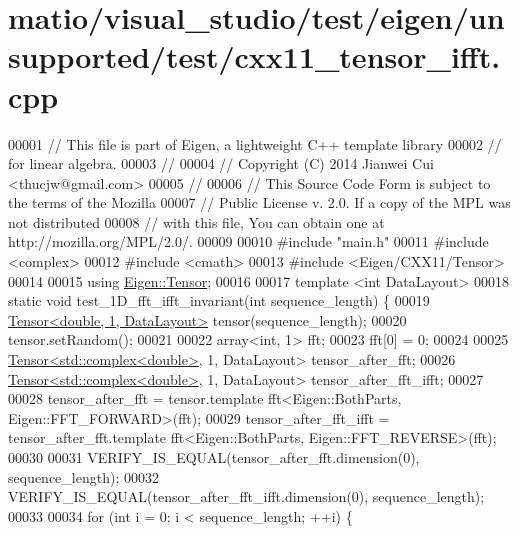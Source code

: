 \hypertarget{matio_2visual__studio_2test_2eigen_2unsupported_2test_2cxx11__tensor__ifft_8cpp_source}{}\section{matio/visual\+\_\+studio/test/eigen/unsupported/test/cxx11\+\_\+tensor\+\_\+ifft.cpp}
\label{matio_2visual__studio_2test_2eigen_2unsupported_2test_2cxx11__tensor__ifft_8cpp_source}

\begin{DoxyCode}
00001 \textcolor{comment}{// This file is part of Eigen, a lightweight C++ template library}
00002 \textcolor{comment}{// for linear algebra.}
00003 \textcolor{comment}{//}
00004 \textcolor{comment}{// Copyright (C) 2014 Jianwei Cui <thucjw@gmail.com>}
00005 \textcolor{comment}{//}
00006 \textcolor{comment}{// This Source Code Form is subject to the terms of the Mozilla}
00007 \textcolor{comment}{// Public License v. 2.0. If a copy of the MPL was not distributed}
00008 \textcolor{comment}{// with this file, You can obtain one at http://mozilla.org/MPL/2.0/.}
00009 
00010 \textcolor{preprocessor}{#include "main.h"}
00011 \textcolor{preprocessor}{#include <complex>}
00012 \textcolor{preprocessor}{#include <cmath>}
00013 \textcolor{preprocessor}{#include <Eigen/CXX11/Tensor>}
00014 
00015 \textcolor{keyword}{using} \hyperlink{class_eigen_1_1_tensor}{Eigen::Tensor};
00016 
00017 \textcolor{keyword}{template} <\textcolor{keywordtype}{int} DataLayout>
00018 \textcolor{keyword}{static} \textcolor{keywordtype}{void} test\_1D\_fft\_ifft\_invariant(\textcolor{keywordtype}{int} sequence\_length) \{
00019   \hyperlink{class_eigen_1_1_tensor}{Tensor<double, 1, DataLayout>} tensor(sequence\_length);
00020   tensor.setRandom();
00021 
00022   array<int, 1> fft;
00023   fft[0] = 0;
00024 
00025   \hyperlink{class_eigen_1_1_tensor}{Tensor<std::complex<double>}, 1, DataLayout> tensor\_after\_fft;
00026   \hyperlink{class_eigen_1_1_tensor}{Tensor<std::complex<double>}, 1, DataLayout> tensor\_after\_fft\_ifft;
00027 
00028   tensor\_after\_fft = tensor.template fft<Eigen::BothParts, Eigen::FFT\_FORWARD>(fft);
00029   tensor\_after\_fft\_ifft = tensor\_after\_fft.template fft<Eigen::BothParts, Eigen::FFT\_REVERSE>(fft);
00030 
00031   VERIFY\_IS\_EQUAL(tensor\_after\_fft.dimension(0), sequence\_length);
00032   VERIFY\_IS\_EQUAL(tensor\_after\_fft\_ifft.dimension(0), sequence\_length);
00033 
00034   \textcolor{keywordflow}{for} (\textcolor{keywordtype}{int} i = 0; i < sequence\_length; ++i) \{

\end{DoxyCode}
